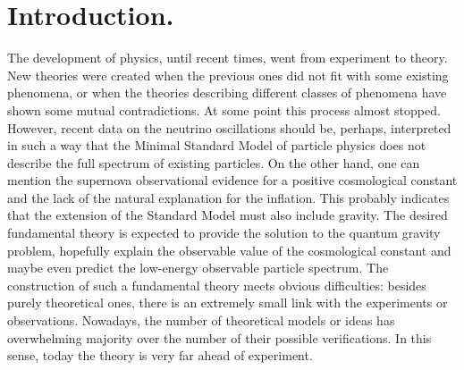 \chapter{Introduction.}

The development of physics, until recent times, went from experiment 
to theory. New theories were created when the previous ones did not 
fit with some existing phenomena, or when the theories describing 
different classes of phenomena have shown some mutual contradictions. 
At some point this process almost stopped. However, recent data on the 
neutrino oscillations should be, perhaps, interpreted in such a way 
that the Minimal Standard Model of particle physics does not 
describe the full spectrum of existing particles. On the other
hand, one can mention the supernova observational evidence for a 
positive cosmological constant and the lack of the natural explanation
for the inflation. This probably indicates that the extension
of the Standard Model must also include gravity. 
The desired fundamental theory is expected to provide the solution 
to the quantum gravity problem, hopefully explain the observable 
value of the cosmological constant and maybe even predict the 
low-energy observable particle spectrum. The construction  
of such a fundamental theory meets obvious difficulties: besides 
purely theoretical ones, there is an extremely small link with the 
experiments or observations. Nowadays, the number of theoretical 
models or ideas has overwhelming majority over the number of their 
possible verifications. In this sense, today the theory is very 
far ahead of experiment. 

